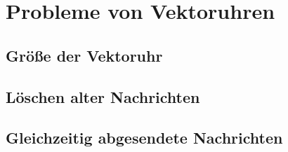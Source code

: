 \section{Probleme von Vektoruhren}
\subsection{Größe der Vektoruhr}
\subsection{Löschen alter Nachrichten}
\subsection{Gleichzeitig abgesendete Nachrichten}
